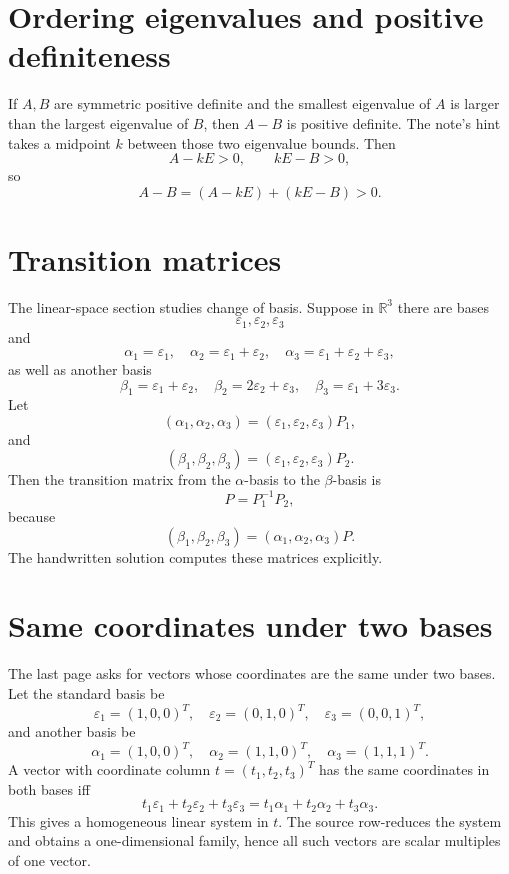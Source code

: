 \section{Ordering eigenvalues and positive definiteness}

If $A,B$ are symmetric positive definite and the smallest eigenvalue of $A$ is larger than the largest eigenvalue of $B$, then $A-B$ is positive definite.  The note's hint takes a midpoint $k$ between those two eigenvalue bounds.  Then
\[
  A-kE>0,\qquad kE-B>0,
\]
so
\[
  A-B=(A-kE)+(kE-B)>0.
\]

\section{Transition matrices}

The linear-space section studies change of basis.  Suppose in $\mathbb R^3$ there are bases
\[
\varepsilon_1,
\varepsilon_2,
\varepsilon_3
\]
and
\[
  \alpha_1=
\varepsilon_1,\quad
  \alpha_2=
\varepsilon_1+
\varepsilon_2,\quad
  \alpha_3=
\varepsilon_1+
\varepsilon_2+
\varepsilon_3,
\]
as well as another basis
\[
  \beta_1=
\varepsilon_1+
\varepsilon_2,\quad
  \beta_2=2
\varepsilon_2+
\varepsilon_3,\quad
  \beta_3=
\varepsilon_1+3
\varepsilon_3.
\]
Let
\[
  (\alpha_1,\alpha_2,\alpha_3)
  =
  (
\varepsilon_1,
\varepsilon_2,
\varepsilon_3)P_1,
\]
and
\[
  (\beta_1,\beta_2,\beta_3)
  =
  (
\varepsilon_1,
\varepsilon_2,
\varepsilon_3)P_2.
\]
Then the transition matrix from the $\alpha$-basis to the $\beta$-basis is
\[
  P=P_1^{-1}P_2,
\]
because
\[
  (\beta_1,\beta_2,\beta_3)
  =
  (\alpha_1,\alpha_2,\alpha_3)P.
\]
The handwritten solution computes these matrices explicitly.

\section{Same coordinates under two bases}

The last page asks for vectors whose coordinates are the same under two bases.  Let the standard basis be
\[
\varepsilon_1=(1,0,0)^T,\quad
\varepsilon_2=(0,1,0)^T,\quad
\varepsilon_3=(0,0,1)^T,
\]
and another basis be
\[
  \alpha_1=(1,0,0)^T,\quad
  \alpha_2=(1,1,0)^T,\quad
  \alpha_3=(1,1,1)^T.
\]
A vector with coordinate column $t=(t_1,t_2,t_3)^T$ has the same coordinates in both bases iff
\[
  t_1
\varepsilon_1+t_2
\varepsilon_2+t_3
\varepsilon_3
  =
  t_1\alpha_1+t_2\alpha_2+t_3\alpha_3.
\]
This gives a homogeneous linear system in $t$.  The source row-reduces the system and obtains a one-dimensional family, hence all such vectors are scalar multiples of one vector.

